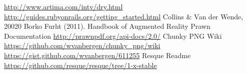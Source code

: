 \begin{thebibliography}{99999}
\singlespace\normalsize

 \url{http://www.artima.com/intv/dry.html}
 \url{http://guides.rubyonrails.org/getting_started.html}
 Collins \& Van der Wende, 20020
 Borko Furht (2011). Handbook of Augmented Reality
 Prawn Documentation \url{http://prawnpdf.org/api-docs/2.0/}
 Chunky PNG Wiki \url{https://github.com/wvanbergen/chunky_png/wiki}
 \url{https://gist.github.com/wvanbergen/611255}
 Resque Readme \url{https://github.com/resque/resque/tree/1-x-stable}


\end{thebibliography}